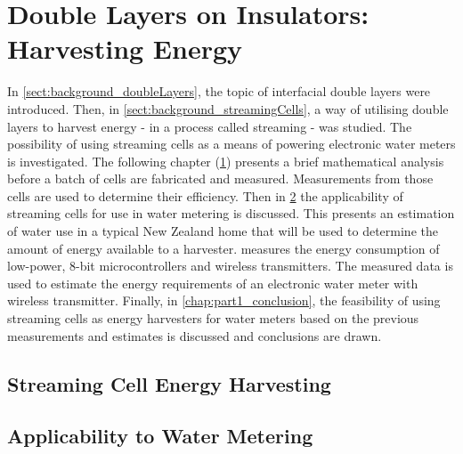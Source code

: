 

\part{Double Layers on Insulators: Harvesting Energy}
   \label{part:doubleLayersOnInsulators}

   In \cref{sect:background_doubleLayers}, the topic of interfacial double layers were introduced.
   Then, in \cref{sect:background_streamingCells}, a way of utilising double layers to harvest energy - in a process called streaming - was studied.
   The possibility of using streaming cells as a means of powering electronic water meters is investigated.
   The following chapter (\cref{chap:part1_streamingCellHarvesters}) presents a brief mathematical analysis before a batch of cells are fabricated and measured.
   Measurements from those cells are used to determine their efficiency.
   Then in \cref{chap:part1_waterMetering} the applicability of streaming cells for use in water metering is discussed.
   This presents an estimation of water use in a typical New Zealand home that will be used to determine the amount of energy available to a harvester.
    measures the energy consumption of low-power, 8-bit microcontrollers and wireless transmitters.
   The measured data is used to estimate the energy requirements of an electronic water meter with wireless transmitter.
   Finally, in \cref{chap:part1_conclusion}, the feasibility of using streaming cells as energy harvesters for water meters based on the previous measurements and estimates is discussed and conclusions are drawn.

   \chapter{Streaming Cell Energy Harvesting}
     \label{chap:part1_streamingCellHarvesters}
     


   \chapter{Applicability to Water Metering}
     \label{chap:part1_waterMetering}
     

